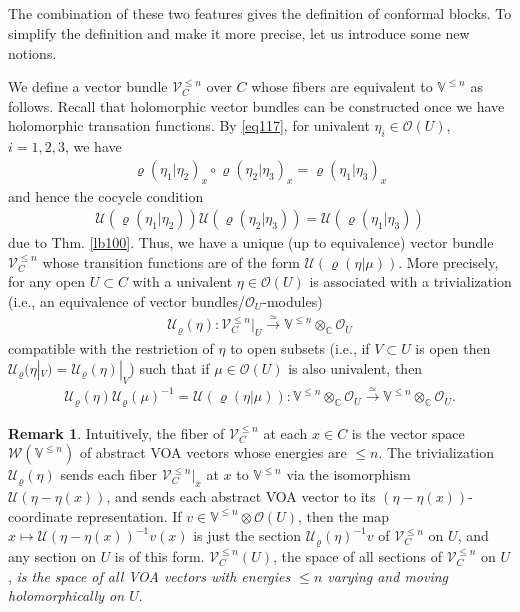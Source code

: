 \documentclass[12pt,a4paper,notitlepage]{article}
\theoremstyle{definition}
\newtheorem{rem}[df]{Remark}
\theoremstyle{plain}
\newcommand{\mc}{\mathcal}
\newcommand{\scr}{\mathscr}
\newcommand{\Vbb}{\mathbb V}
\newcommand{\Cbb}{\mathbb C}
\numberwithin{equation}{section}
\begin{document}
\subsection{}\label{lb119}

The combination of these two features gives the definition of conformal blocks. To simplify the definition and make it more precise, let us introduce some new notions.


We define a vector bundle $\scr V^{\leq n}_C$ \index{V@$\scr V_C^{\leq n},\scr V_C$} over $C$ whose fibers are equivalent to $\Vbb^{\leq n}$ as follows. Recall that holomorphic vector bundles can be constructed once we have holomorphic transation functions. By \eqref{eq117}, for univalent $\eta_i\in\scr O(U)$, $i=1,2,3$, we have
\begin{align}
\varrho(\eta_1|\eta_2)_x\circ\varrho(\eta_2|\eta_3)_x=\varrho(\eta_1|\eta_3)_x	
\end{align}
and hence the cocycle condition
\begin{align}
\mc U(\varrho(\eta_1|\eta_2))\mc U(\varrho(\eta_2|\eta_3))=\mc U(\varrho(\eta_1|\eta_3))	
\end{align}
due to Thm. \ref{lb100}. Thus, we have a unique (up to equivalence) vector bundle $\scr V^{\leq n}_C$ whose transition functions are of the form $\mc U(\varrho(\eta|\mu))$. More precisely, for any open $U\subset C$ with a univalent $\eta\in\scr O(U)$ is associated with a trivialization (i.e., an equivalence of vector bundles/$\scr O_U$-modules) \index{U@$\mc U_\varrho(\eta)$}
\begin{align}
\mc U_\varrho(\eta):\scr V^{\leq n}_C\big|_U\xrightarrow{\simeq}	\Vbb^{\leq n}\otimes_\Cbb\scr O_U\label{eq179}
\end{align}
compatible with the restriction of $\eta$ to open subsets (i.e., if $V\subset U$ is open then $\mc U_\varrho(\eta|_V)=\mc U_\varrho(\eta)|_V$) such that if $\mu\in\scr O(U)$ is also univalent, then
\begin{align}
\mc U_\varrho(\eta)\mc U_\varrho(\mu)^{-1}=\mc U(\varrho(\eta|\mu)):\Vbb^{\leq n}\otimes_\Cbb\scr O_U\xrightarrow{\simeq}	\Vbb^{\leq n}\otimes_\Cbb\scr O_U.\label{eq180}
\end{align}

\begin{rem}\label{lb106}
Intuitively, the fiber of $\scr V^{\leq n}_C$ at each $x\in C$ is the vector space $\scr W(\Vbb^{\leq n})$ of abstract VOA vectors whose energies are $\leq n$. The trivialization $\mc U_\varrho(\eta)$ sends each fiber $\scr V^{\leq n}_C|_x$ at $x$  to $\Vbb^{\leq n}$ via the isomorphism $\mc U(\eta-\eta(x))$, and sends each abstract VOA vector to its $(\eta-\eta(x))$-coordinate representation.  If $v\in\Vbb^{\leq n}\otimes\scr O(U)$, then the map $x\mapsto \mc U(\eta-\eta(x))^{-1}v(x)$ is just the section $\mc U_\varrho(\eta)^{-1}v$ of $\scr V^{\leq n}_C$ on $U$, and any section on $U$ is of this form. $\scr V^{\leq n}_C(U)$, the space of all sections of $\scr V^{\leq n}_C$ on $U$, \emph{is the space of all VOA vectors with energies $\leq n$ varying and moving holomorphically on $U$}. 
\end{rem}
\end{document}
